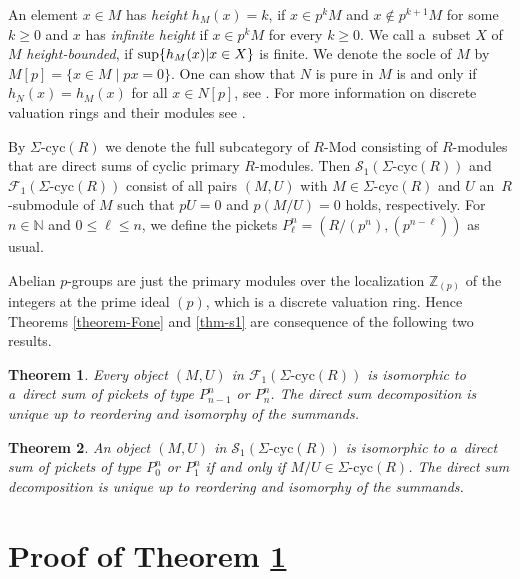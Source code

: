 \documentclass[twoside,leqno,12pt]{amsart}
\def\SigCyc{\mbox{$\Sigma$-cyc}}
\def\sup{\mbox{\rm sup}}
\newtheorem{thm}{Theorem}[section]
\theoremstyle{definition}
\theoremstyle{remark}
\numberwithin{equation}{section}
\begin{document}
 An element $x\in M$ has {\it height} $h_M(x)=k$, if $x\in p^k M$ and $x\notin p^{k+1}M$ for some $k\geq 0$ and
 $x$ has {\it infinite height} if $x\in p^k M$ for every $k\geq0$. We call a~subset $X$ of $M$ {\it height-bounded}, if $\sup\{h_{M}(x)|x\in X\}$ is finite. We denote the socle of $M$ by $M[p]=\{x\in M\;|\; px=0\}$. One can show that $N$ is pure in $M$ is and only if $h_N(x)=h_M(x)$ for all $x\in N[p]$, see \cite[Exercise 6, page 5036]{kt}.  For more information on discrete valuation rings and their modules see \cite{kt}.


By $\SigCyc(R)$ we denote the full subcategory of $R$-Mod consisting of $R$-modules
that are direct sums of cyclic primary $R$-modules.
Then  $\mathcal{S}_1(\SigCyc(R))$ and $\mathcal F_1(\SigCyc(R))$
consist of all pairs $(M,U)$
with $M\in\SigCyc(R)$ and $U$ an~$R$-submodule of $M$ such that
$pU=0$ and $p(M/U)=0$ holds, respectively.
For $n\in\mathbb N$ and $0\leq \ell \leq n$,
we define the pickets $P_\ell^n=(R/(p^n),(p^{n-\ell}))$
as usual.


Abelian $p$-groups are just the primary modules over the localization
$\mathbb Z_{(p)}$ of the integers at the prime ideal $(p)$, which is a discrete valuation ring.
Hence Theorems \ref{theorem-Fone} and \ref{thm-s1} are consequence of the following two results.

\begin{thm} \label{theorem-Fone-DVR}
 Every object $(M,U)$ in $\mathcal{F}_1(\SigCyc(R))$  is isomorphic to a~direct sum of pickets
 of type $P_{n-1}^n$ or $P_n^n$.
 The direct sum decomposition is unique up to reordering and isomorphy of the summands.
\end{thm}

\begin{thm} \label{mainR}
 An object $(M,U)$ in $\mathcal{S}_1(\SigCyc(R))$  is isomorphic to a~direct sum of pickets
 of type $P_0^n$ or $P_1^n$ if and only if $M/U\in\SigCyc(R)$.
 The direct sum decomposition is unique up to reordering and isomorphy of the summands.
\end{thm}


\section{Proof of Theorem \ref{theorem-Fone-DVR}}
\label{seq-proof-thm1}
\end{document}
